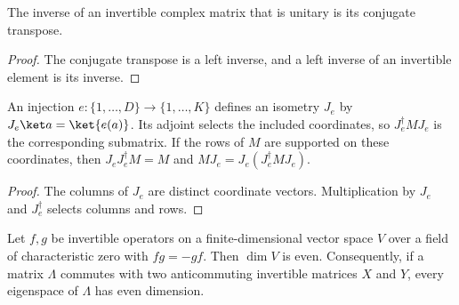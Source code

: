 \begin{lemma}
    \label{lem:unitary_general_linear_inverse}
    \leanok
    The inverse of an invertible complex matrix that is unitary is its
    conjugate transpose.
\end{lemma}

\begin{proof}\leanok
    The conjugate transpose is a left inverse, and a left inverse of an
    invertible element is its inverse.
\end{proof}

\begin{lemma}
    \label{lem:coordinate_inclusion}
    \leanok
    An injection $e:\{1,\ldots,D\}\to\{1,\ldots,K\}$ defines an
    isometry $J_e$ by $J_e\ket a=\ket{e(a)}$. Its adjoint selects the
    included coordinates, so $J_e^\dagger M J_e$ is the corresponding
    submatrix. If the rows of $M$ are supported on these coordinates,
    then $J_eJ_e^\dagger M=M$ and $MJ_e=J_e(J_e^\dagger M J_e)$.
\end{lemma}

\begin{proof}\leanok
    The columns of $J_e$ are distinct coordinate vectors. Multiplication
    by $J_e$ and $J_e^\dagger$ selects columns and rows.
\end{proof}

\begin{lemma}
    \label{lem:even_finrank_of_anticommute}
    \leanok
    Let $f,g$ be invertible operators on a finite-dimensional vector
    space $V$ over a field of characteristic zero with $fg=-gf$. Then
    $\dim V$ is even. Consequently, if a matrix $\Lambda$ commutes with two
    anticommuting invertible matrices $X$ and $Y$, every eigenspace of
    $\Lambda$ has even dimension.
\end{lemma}

